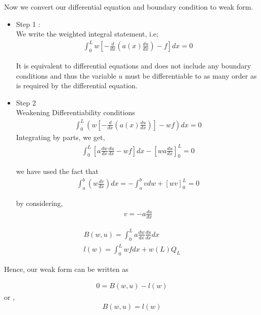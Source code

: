 	Now we convert our differential equation and boundary condition to weak form.\\
\begin{itemize}
	\item Step 1 : \\
	We write the weighted integral statement, i.e;\\
	\begin{eqnarray}
		\int_{0}^{L}  w \left[ -\frac{d}{dx} \left( a(x)\frac{du}{dx} \right) - f \right] dx = 0
	\end{eqnarray}

	It is equivalent to differential equations and does not include any boundary conditions and thus the variable $u$ must be differentiable to as many order as is required by the differential equation.
	\item Step 2\\
	Weakening Differentiability conditions
	\begin{eqnarray}
		\int_{0}^{L}  \left( w \left[ -\frac{d}{dx} \left( a(x)\frac{du}{dx} \right) \right] - wf \right)  dx = 0
	\end{eqnarray}
	Integrating by parts, we get,
	\begin{eqnarray}
		\int_{0}^{L} \left[ a \frac{dw}{dx} \frac{du}{dx} - wf \right] dx  - \left[ wa \frac{du}{dx}\right]_0^L = 0
	\end{eqnarray}


	we have used the fact that 
	\begin{eqnarray}
		\int_{a}^{b} \left( w \frac{dv}{dx} \right)dx  =  -\int_{a}^{b} v dw + \left[wv\right]_0^L = 0
	\end{eqnarray}

by considering,
	\begin{eqnarray}
		v = -a\frac{du}{dx}
	\end{eqnarray}


	
\end{itemize}

\begin{eqnarray}
	B(w,u) = \int_{0}^{L} a \frac{dw}{dx} \frac{du}{dx} dx \\
	l(w) = \int_{0}^{L} wf dx + w(L) Q_L
\end{eqnarray}

Hence, our weak form can be written as

\begin{eqnarray}
	0 = B(w,u) - l(w)
\end{eqnarray}
or ,
\begin{eqnarray}
	B(w,u) = l(w)
\end{eqnarray}

